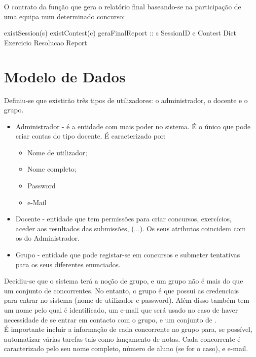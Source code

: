 
O contrato da função que gera o relatório final baseando-se na participação de uma equipa num determinado concurso:

\prop
{ existSession(s) \wedge existContest(c) \wedge }
{geraFinalReport :: s \unif SessionID \rarrow c \unif Contest \rarrow Dict Exercicio Resolucao \rarrow Report}
{ }

\section{Modelo de Dados}\label{sec modedados}

Definiu-se que existirão três tipos de utilizadores: o administrador, o docente e o grupo.\\

\begin{itemize}
  \item Administrador - é a entidade com mais poder no sistema. É o único que pode criar contas do tipo docente. É caracterizado por:
    \begin{itemize}
      \item Nome de utilizador;
      \item Nome completo;
      \item Password
      \item e-Mail
    \end{itemize}
  \item Docente - entidade que tem permissões para criar concursos, exercícios, aceder aos resultados das submissões, (...). 
Os seus atributos coincidem com os do Administrador.
  \item Grupo - entidade que pode registar-se em concursos e submeter tentativas para os seus diferentes enunciados.
\end{itemize}

Decidiu-se que o sistema terá a noção de grupo, e um grupo não é mais do que um conjunto de concorrentes. No entanto,
o grupo é que possui as credenciais para entrar no sistema (nome de utilizador e password). 
Além disso também tem um nome pelo qual é identificado, um e-mail que será usado no caso de haver necessidade de se entrar em contacto
com o grupo, e um conjunto de .\\

É importante incluir a informação de cada concorrente no grupo para, se possível, automatizar várias tarefas tais como lançamento de notas.
Cada concorrente é caracterizado pelo seu nome completo, número de aluno (se for o caso), e e-mail.\\

